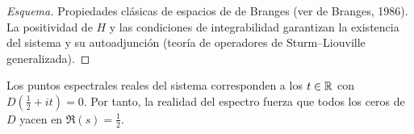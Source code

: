 \begin{proof}[Esquema]
Propiedades clásicas de espacios de de Branges (ver de Branges, 1986).
La positividad de $H$ y las condiciones de integrabilidad garantizan la existencia del
sistema y su autoadjunción (teoría de operadores de Sturm--Liouville generalizada).
\end{proof}

\begin{proposition}
Los puntos espectrales reales del sistema corresponden a los $t\in\Bbb R$ con
$D(\tfrac{1}{2}+it)=0$. Por tanto, la realidad del espectro fuerza que todos los ceros
de $D$ yacen en $\Re(s)=\tfrac{1}{2}$.
\end{proposition}
